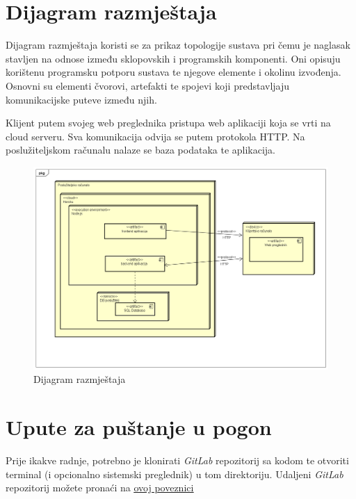 			\eject 
		
		
		\section{Dijagram razmještaja}
			
			
			 Dijagram razmještaja koristi se za prikaz topologije sustava pri čemu je naglasak stavljen na odnose između sklopovskih i programskih komponenti. Oni opisuju korištenu programsku potporu sustava te njegove elemente i okolinu izvođenja. Osnovni su elementi čvorovi, artefakti te spojevi koji predstavljaju komunikacijske puteve između njih.
			 
			 Klijent putem svojeg web preglednika pristupa web aplikaciji koja se vrti na cloud serveru. Sva komunikacija odvija se putem protokola HTTP. Na poslužiteljskom računalu nalaze se baza podataka te aplikacija.
			 \begin{figure}[H]
    			\includegraphics[width=1\linewidth]{dijagrami/Deployment Diagram.png}
    			\caption{Dijagram razmještaja}
    			\label{fig:Dijagram razmještaja} 
    		\end{figure}
			\eject 
		
		\section{Upute za puštanje u pogon}
		
		    Prije ikakve radnje, potrebno je klonirati \textit{GitLab} repozitorij sa kodom te otvoriti terminal (i opcionalno sistemski preglednik) u tom direktoriju. Udaljeni \textit{GitLab} repozitorij možete pronaći na  \underline{\href{https://gitlab.com/Cubi5/seven}{ovoj poveznici}}
		    
